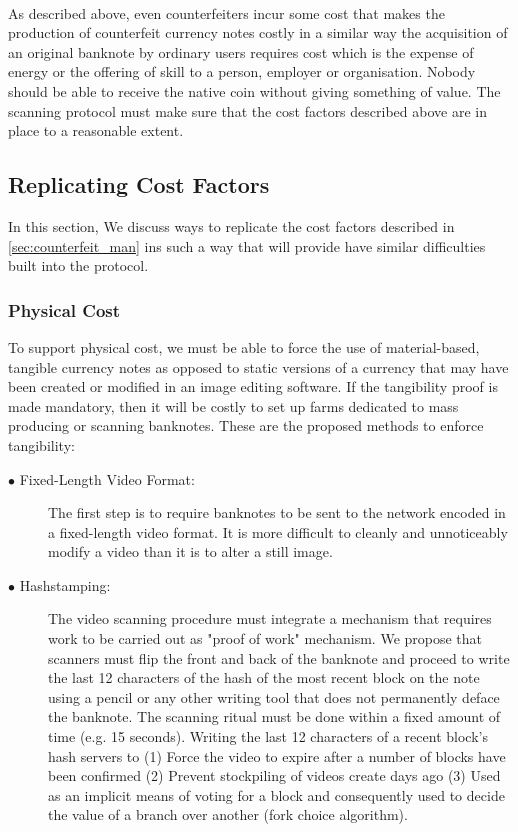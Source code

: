 \paragraph{}{
	As described above, even counterfeiters incur some cost that makes the production of counterfeit currency notes costly in a similar way the acquisition of an original banknote by ordinary users requires cost which is the expense of energy or the offering of skill to a person, employer or organisation. Nobody should be able to receive the native coin without giving something of value. The scanning protocol must make sure that the cost factors described above are in place to a reasonable extent. 
}

\subsection{Replicating Cost Factors}

In this section, We discuss ways to replicate the cost factors described in  \autoref{sec:counterfeit_man} ins such a way that will provide have similar difficulties built into the protocol. 

\vspace{1mm}
\subsubsection{Physical Cost}
\label{sec:physical_cost}
 To support physical cost, we must be able to force the use of material-based, tangible currency notes as opposed to static versions of a currency that may have been created or modified in an image editing software. If the tangibility proof is made mandatory, then it will be costly to set up farms dedicated to mass producing or scanning banknotes. These are the proposed methods to enforce tangibility:
 
 \vspace{1mm}
\begin{description}
  \item[$\bullet$ Fixed-Length Video Format:] The first step is to require banknotes to be sent to the network encoded in a fixed-length video format. It is more difficult to cleanly and unnoticeably modify a video than it is to alter a still image.
  
  \item[$\bullet$ Hashstamping:] The video scanning procedure must integrate a mechanism that requires work to be carried out as "proof of work" mechanism. We propose that scanners must flip the front and back of the banknote and proceed to write the last 12 characters of the hash of the most recent block on the note using a pencil or any other writing tool that does not permanently deface the banknote. The scanning ritual must be done within a fixed amount of time (e.g. 15 seconds). Writing the last 12 characters of a recent block's hash servers to (1) Force the video to expire after a number of blocks have been confirmed (2) Prevent stockpiling of videos create days ago (3) Used as an implicit means of voting for a block and consequently used to decide the value of a branch over another (fork choice algorithm). 
   
 \end{description}
 
